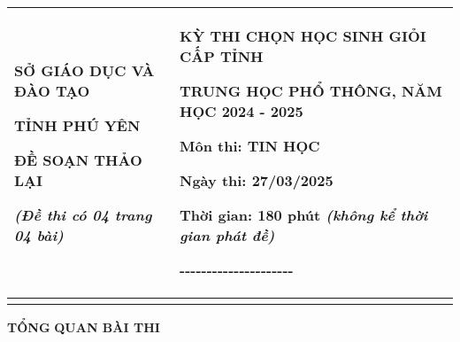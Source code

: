 \documentclass[
]{article}
\author{}
\date{}
\begin{document}
\begin{longtable}[]{@{}
  >{\raggedright\arraybackslash}p{}
  >{\raggedright\arraybackslash}p{}@{}}
\toprule\noalign{}
\begin{minipage}[b]{\linewidth}\centering
\textbf{SỞ GIÁO DỤC VÀ ĐÀO TẠO}

\textbf{TỈNH PHÚ YÊN}

\textbf{ĐỀ SOẠN THẢO LẠI}

\it{(Đề thi có 04 trang 04 bài)}
\end{minipage} & \begin{minipage}[b]{\linewidth}\centering
\textbf{KỲ THI CHỌN HỌC SINH GIỎI CẤP TỈNH}

\textbf{TRUNG HỌC PHỔ THÔNG, NĂM HỌC 2024 - 2025}

\textbf{Môn thi: TIN HỌC}

\textbf{Ngày thi:} \textbf{27/03/2025}

\textbf{Thời gian:} 180 phút \it{(không kể thời gian phát đề)}

-\/-\/-\/-\/-\/-\/-\/-\/-\/-\/-\/-\/-\/-\/-\/-\/-\/-\/-\/-\/-
\end{minipage} \\
\midrule\noalign{}
\endhead
\bottomrule\noalign{}
\endlastfoot
\end{longtable}

\textbf{TỔNG} \textbf{QUAN BÀI THI}
\end{document}
